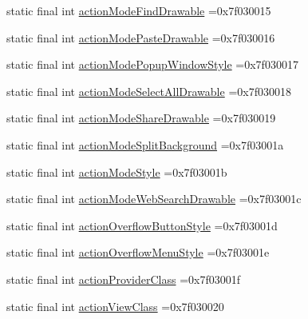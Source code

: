 \begin{DoxyCompactItemize}
\item 
static final int \mbox{\hyperlink{classbr_1_1unb_1_1cic_1_1mp_1_1marketmaster_1_1test_1_1R_1_1attr_a51d48626435899f67b39fc9c2b06cd48}{action\+Mode\+Find\+Drawable}} =0x7f030015
\item 
static final int \mbox{\hyperlink{classbr_1_1unb_1_1cic_1_1mp_1_1marketmaster_1_1test_1_1R_1_1attr_a52fef93b5a1d842906df5c8d10923349}{action\+Mode\+Paste\+Drawable}} =0x7f030016
\item 
static final int \mbox{\hyperlink{classbr_1_1unb_1_1cic_1_1mp_1_1marketmaster_1_1test_1_1R_1_1attr_a1685ef0f0f35f16b21bef9ed642eb4df}{action\+Mode\+Popup\+Window\+Style}} =0x7f030017
\item 
static final int \mbox{\hyperlink{classbr_1_1unb_1_1cic_1_1mp_1_1marketmaster_1_1test_1_1R_1_1attr_a7b44a394945030d70bd75facb5d2436c}{action\+Mode\+Select\+All\+Drawable}} =0x7f030018
\item 
static final int \mbox{\hyperlink{classbr_1_1unb_1_1cic_1_1mp_1_1marketmaster_1_1test_1_1R_1_1attr_a87b2f3e3b3678ee134a4e917a249fa9f}{action\+Mode\+Share\+Drawable}} =0x7f030019
\item 
static final int \mbox{\hyperlink{classbr_1_1unb_1_1cic_1_1mp_1_1marketmaster_1_1test_1_1R_1_1attr_a0f0ee65b33074e619af438c42819554d}{action\+Mode\+Split\+Background}} =0x7f03001a
\item 
static final int \mbox{\hyperlink{classbr_1_1unb_1_1cic_1_1mp_1_1marketmaster_1_1test_1_1R_1_1attr_af4003d50868c3f3183e388fd1626ddac}{action\+Mode\+Style}} =0x7f03001b
\item 
static final int \mbox{\hyperlink{classbr_1_1unb_1_1cic_1_1mp_1_1marketmaster_1_1test_1_1R_1_1attr_a49a2ad9af63858d3da072138d923141d}{action\+Mode\+Web\+Search\+Drawable}} =0x7f03001c
\item 
static final int \mbox{\hyperlink{classbr_1_1unb_1_1cic_1_1mp_1_1marketmaster_1_1test_1_1R_1_1attr_a3010fbf705771e1d330f0c18dc6986ba}{action\+Overflow\+Button\+Style}} =0x7f03001d
\item 
static final int \mbox{\hyperlink{classbr_1_1unb_1_1cic_1_1mp_1_1marketmaster_1_1test_1_1R_1_1attr_a859e9f15960b76e06c68d80edc10c72d}{action\+Overflow\+Menu\+Style}} =0x7f03001e
\item 
static final int \mbox{\hyperlink{classbr_1_1unb_1_1cic_1_1mp_1_1marketmaster_1_1test_1_1R_1_1attr_af0908ce60da6244a3c2b617167b33404}{action\+Provider\+Class}} =0x7f03001f
\item 
static final int \mbox{\hyperlink{classbr_1_1unb_1_1cic_1_1mp_1_1marketmaster_1_1test_1_1R_1_1attr_a32c306ad704086ba78b73f19f16e4e2b}{action\+View\+Class}} =0x7f030020

\end{DoxyCompactItemize}
